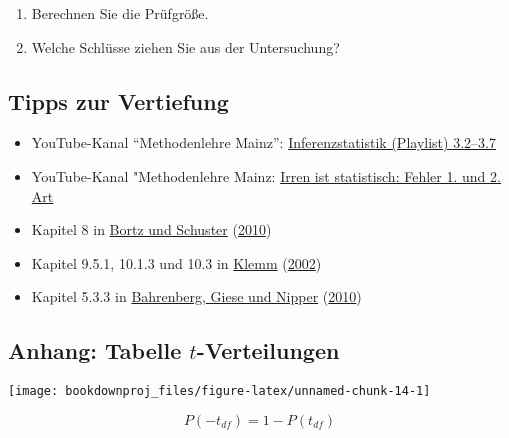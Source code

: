 \documentclass[
  ngerman,
]{article}
\providecommand{\tightlist}{%
  \setlength{\itemsep}{0pt}\setlength{\parskip}{0pt}}
\begin{document}
\begin{enumerate}
\def\labelenumi{\alph{enumi})}
\tightlist
\item
  Berechnen Sie die Prüfgröße.
\item
  Welche Schlüsse ziehen Sie aus der Untersuchung?
\end{enumerate}

\hypertarget{tipps-zur-vertiefung-5}{%
\subsection{Tipps zur Vertiefung}\label{tipps-zur-vertiefung-5}}

\begin{itemize}
\tightlist
\item
  YouTube-Kanal ``Methodenlehre Mainz'': \href{https://www.youtube.com/watch?v=pCCvA28l9es\&index=17\&list=PLSFgFMMLqanK_DUMJycmua0ODSaKq28Gb}{Inferenzstatistik (Playlist) 3.2--3.7}
\item
  YouTube-Kanal "Methodenlehre Mainz: \href{https://www.youtube.com/watch?v=q1jkbDMwflg}{Irren ist statistisch: Fehler 1. und 2. Art}
\item
  Kapitel 8 in \protect\hyperlink{ref-bortz}{Bortz und Schuster} (\protect\hyperlink{ref-bortz}{2010})
\item
  Kapitel 9.5.1, 10.1.3 und 10.3 in \protect\hyperlink{ref-klemm}{Klemm} (\protect\hyperlink{ref-klemm}{2002})
\item
  Kapitel 5.3.3 in \protect\hyperlink{ref-bahrenberg}{Bahrenberg, Giese und Nipper} (\protect\hyperlink{ref-bahrenberg}{2010})
\end{itemize}

\pagebreak

\hypertarget{anhang-tabelle-t-verteilungen-1}{%
\subsection{\texorpdfstring{Anhang: Tabelle \(t\)-Verteilungen}{Anhang: Tabelle t-Verteilungen}}\label{anhang-tabelle-t-verteilungen-1}}

\begin{multicols}{2}
\vfill


\begin{center}\texttt{[image: bookdownproj\_files/figure-latex/unnamed-chunk-14-1]} \end{center}
\vfill
\columnbreak
\vfill
\[ P(-t_{df})= 1 - P(t_{df}) \]
\vfill
\end{multicols}
\end{document}
